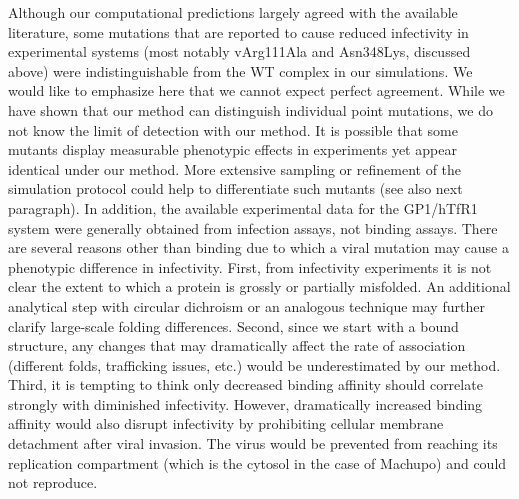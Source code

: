 \documentclass[12pt]{article}
\begin{document}
Although our computational predictions largely agreed with the available literature, some mutations that are reported to cause reduced infectivity in experimental systems (most notably vArg111Ala and Asn348Lys, discussed above) were indistinguishable from the WT complex in our simulations. We would like to emphasize here that we cannot expect perfect agreement. While we have shown that our method can distinguish individual point mutations, we do not know the limit of detection with our method. It is possible that some mutants display measurable phenotypic effects in experiments yet appear identical under our method. More extensive sampling or refinement of the simulation protocol could help to differentiate such mutants (see also next paragraph). In addition, the available experimental data for the GP1/hTfR1 system were generally obtained from infection assays, not binding assays. There are several reasons other than binding due to which a viral mutation may cause a phenotypic difference in infectivity. First, from infectivity experiments it is not clear the extent to which a protein is grossly or partially misfolded. An additional analytical step with circular dichroism or an analogous technique may further clarify large-scale folding differences. Second, since we start with a bound structure, any changes that may dramatically affect the rate of association (different folds, trafficking issues, etc.) would be underestimated by our method. Third, it is tempting to think only decreased binding affinity should correlate strongly with diminished infectivity. However, dramatically increased binding affinity would also disrupt infectivity by prohibiting cellular membrane detachment after viral invasion. The virus would be prevented from reaching its replication compartment (which is the cytosol in the case of Machupo) and could not reproduce.
\end{document}
